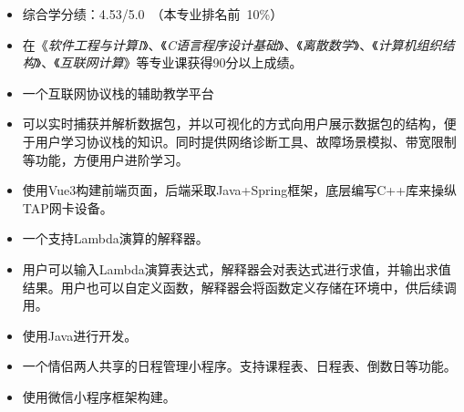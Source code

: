 \documentclass[10pt,a4paper,ragged2e,withhyper]{altacv}
\begin{document}
\begin{paracol}{2}

\begin{itemize}
\item 综合学分绩：4.53/5.0~（本专业排名前~10\%）
\item 在《\emph{软件工程与计算I}》、《\emph{C语言程序设计基础}》、《\emph{离散数学}》、《\emph{计算机组织结构}》、《\emph{互联网计算}》等专业课获得90分以上成绩。
\end{itemize}



\begin{itemize}
\item 一个互联网协议栈的辅助教学平台
\item 可以实时捕获并解析数据包，并以可视化的方式向用户展示数据包的结构，便于用户学习协议栈的知识。同时提供网络诊断工具、故障场景模拟、带宽限制等功能，方便用户进阶学习。
\item 使用Vue3构建前端页面，后端采取Java+Spring框架，底层编写C++库来操纵TAP网卡设备。

\end{itemize}

\divider

\begin{itemize}
  \item 一个支持Lambda演算的解释器。
  \item 用户可以输入Lambda演算表达式，解释器会对表达式进行求值，并输出求值结果。用户也可以自定义函数，解释器会将函数定义存储在环境中，供后续调用。
  \item 使用Java进行开发。
\end{itemize}

\divider

\begin{itemize}
  \item 一个情侣两人共享的日程管理小程序。支持课程表、日程表、倒数日等功能。
  \item 使用微信小程序框架构建。
\end{itemize}
\medskip


\end{paracol}
\end{document}
